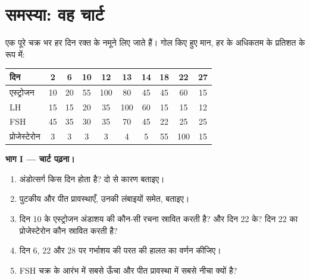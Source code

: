 \section{समस्या: वह चार्ट}

\begin{problem}
\label{pb:g11:hormones-and-reproduction:1}
एक पूरे चक्र भर हर दिन रक्त के नमूने लिए जाते हैं। गोल किए हुए मान, हर
 के अधिकतम के प्रतिशत के रूप में:

\begin{center}
\begin{tabular}{lccccccccc}
दिन & 2 & 6 & 10 & 12 & 13 & 14 & 18 & 22 & 27 \\ \hline
एस्ट्रोजन & 10 & 20 & 55 & 100 & 80 & 45 & 45 & 60 & 15 \\
LH & 15 & 15 & 20 & 35 & 100 & 60 & 15 & 15 & 12 \\
FSH & 45 & 35 & 30 & 35 & 70 & 45 & 22 & 25 & 25 \\
प्रोजेस्टेरोन & 3 & 3 & 3 & 3 & 4 & 5 & 55 & 100 & 15 \\
\end{tabular}
\end{center}

\medskip
\noindent\textbf{भाग I --- चार्ट पढ़ना।}
\begin{enumerate}
  \item अंडोत्सर्ग किस दिन होता है? दो  से कारण बताइए।
  \item पुटकीय और पीत प्रावस्थाएँ, उनकी लंबाइयों समेत, बताइए।
  \item दिन 10 के एस्ट्रोजन अंडाशय की कौन-सी रचना स्रावित करती है? और दिन
        22 के? दिन 22 का प्रोजेस्टेरोन कौन स्रावित करती है?
  \item दिन 6, 22 और 28 पर गर्भाशय की परत की हालत का वर्णन कीजिए।
  \item FSH चक्र के आरंभ में सबसे ऊँचा और पीत प्रावस्था में सबसे नीचा
        क्यों है?
\end{enumerate}


\end{problem}
